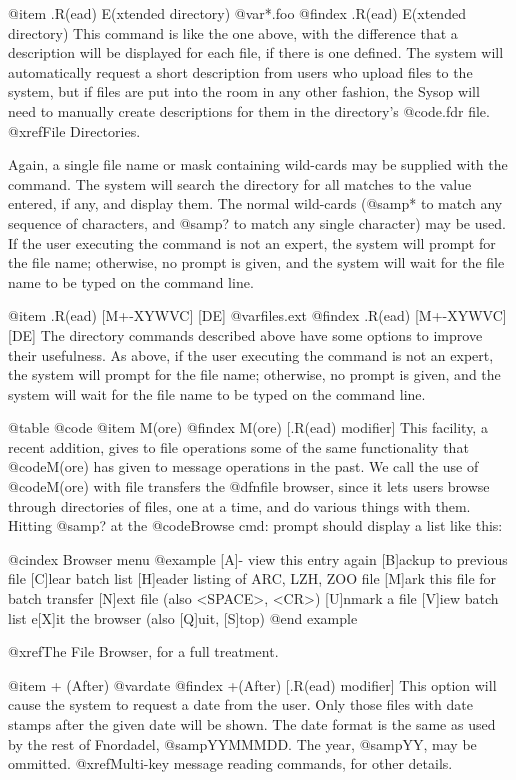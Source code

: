 @item .R(ead) E(xtended directory) @var{*.foo}
@findex .R(ead) E(xtended directory)
This command is like the one above, with the difference that a
description will be displayed for each file, if there is one defined.
The system will automatically request a short description from users
who upload files to the system, but if files are put into the room in
any other fashion, the Sysop will need to manually create descriptions
for them in the directory's @code{.fdr} file.  @xref{File Directories}.

Again, a single file name or mask containing wild-cards
may be supplied with the command.  The system will search the directory
for all matches to the value entered, if any, and display them.  The
normal wild-cards (@samp{*} to match any sequence of characters, and @samp{?} to
match any single character) may be used.  If the user executing the
command is not an expert, the system will prompt for the file name;
otherwise, no prompt is given, and the system will wait for the file
name to be typed on the command line.

@item .R(ead) [M+-XYWVC] [DE] @var{files.ext}
@findex .R(ead) [M+-XYWVC] [DE]
The directory commands described above have some options to
improve their usefulness.  As above, if the user executing the
command is not an expert, the system will prompt for the file name;
otherwise, no prompt is given, and the system will wait for the file
name to be typed on the command line.

@table @code
@item M(ore)
@findex M(ore) [.R(ead) modifier]
This facility, a recent addition, gives to file
operations some of the same functionality that @code{M(ore)} has
given to message operations in the past.  We call the use of
@code{M(ore)} with file transfers the @dfn{file browser}, since it lets
users browse through directories of files, one at a time,
and do various things with them.  Hitting @samp{?} at the
@code{Browse cmd:} prompt should display a list like this:

@cindex Browser menu
@example
[A]- view this entry again
[B]ackup to previous file
[C]lear batch list
[H]eader listing of ARC, LZH, ZOO file
[M]ark this file for batch transfer
[N]ext file (also <SPACE>, <CR>)
[U]nmark a file
[V]iew batch list
e[X]it the browser (also [Q]uit, [S]top)
@end example

@xref{The File Browser}, for a full treatment.

@item + (After) @var{date}
@findex +(After) [.R(ead) modifier]
This option will cause the system to request a date
from the user.  Only those files with date stamps after the
given date will be shown.  The date format is the same as used
by the rest of Fnordadel, @samp{YYMMMDD}.  The year, @samp{YY}, may be
ommitted.  @xref{Multi-key message reading commands}, for other details.

